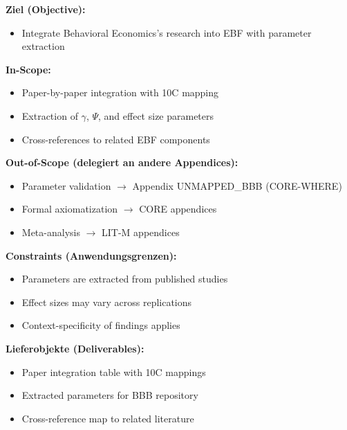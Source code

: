 
\begin{tcolorbox}[
    colback=orange!5!white,
    colframe=orange!75!black,
    title={\textbf{Appendix Scope: Ziel / In-Scope / Out-of-Scope / Constraints}},
    fonttitle=\bfseries
]

\textbf{Ziel (Objective):}
\begin{itemize}[nosep]
    \item Integrate Behavioral Economics's research into EBF with parameter extraction
\end{itemize}

\textbf{In-Scope:}
\begin{itemize}[nosep]
    \item Paper-by-paper integration with 10C mapping
    \item Extraction of $\gamma$, $\Psi$, and effect size parameters
    \item Cross-references to related EBF components
\end{itemize}

\textbf{Out-of-Scope (delegiert an andere Appendices):}
\begin{itemize}[nosep]
    \item Parameter validation $\rightarrow$ Appendix UNMAPPED_BBB (CORE-WHERE)
    \item Formal axiomatization $\rightarrow$ CORE appendices
    \item Meta-analysis $\rightarrow$ LIT-M appendices
\end{itemize}

\textbf{Constraints (Anwendungsgrenzen):}
\begin{itemize}[nosep]
    \item Parameters are extracted from published studies
    \item Effect sizes may vary across replications
    \item Context-specificity of findings applies
\end{itemize}

\textbf{Lieferobjekte (Deliverables):}
\begin{itemize}[nosep]
    \item Paper integration table with 10C mappings
    \item Extracted parameters for BBB repository
    \item Cross-reference map to related literature
\end{itemize}

\end{tcolorbox}

